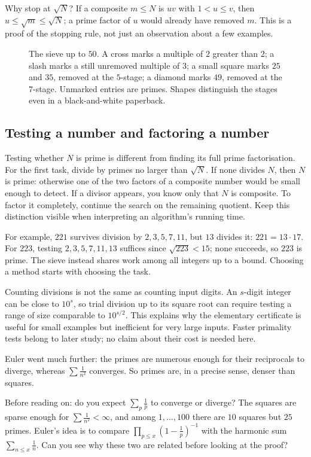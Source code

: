 Why stop at $\sqrt N$? If a composite $m\le N$ is $uv$ with $1<u\le v$, then $u\le\sqrt m\le\sqrt N$; a prime factor of $u$ would already have removed $m$. This is a proof of the stopping rule, not just an observation about a few examples.

\begin{figure}[ht]
\centering{}
\caption{The sieve up to $50$. A cross marks a multiple of $2$ greater than $2$; a slash marks a still unremoved multiple of $3$; a small square marks $25$ and $35$, removed at the $5$-stage; a diamond marks $49$, removed at the $7$-stage. Unmarked entries are primes. Shapes distinguish the stages even in a black-and-white paperback.}
\label{fig:sieve}
\end{figure}

\subsection*{Testing a number and factoring a number}
Testing whether $N$ is prime is different from finding its full prime factorisation. For the first task, divide by primes no larger than $\sqrt N$. If none divides $N$, then $N$ is prime: otherwise one of the two factors of a composite number would be small enough to detect. If a divisor appears, you know only that $N$ is composite. To factor it completely, continue the search on the remaining quotient. Keep this distinction visible when interpreting an algorithm's running time.

For example, $221$ survives division by $2,3,5,7,11$, but $13$ divides it:
$221=13\cdot17$. For $223$, testing $2,3,5,7,11,13$ suffices since $\sqrt{223}<15$;
none succeeds, so $223$ is prime. The sieve instead shares work among all
integers up to a bound. Choosing a method starts with choosing the task.

Counting divisions is not the same as counting input digits. An $s$-digit
integer can be close to $10^s$, so trial division up to its square root
can require testing a range of size comparable to $10^{s/2}$. This explains
why the elementary certificate is useful for small examples but inefficient
for very large inputs. Faster primality tests belong to later study; no
claim about their cost is needed here.

Euler went much further: the primes are numerous enough for their reciprocals to diverge, whereas $\sum\frac1{n^2}$ converges. So primes are, in a precise sense, denser than squares.

\begin{think}
Before reading on: do you expect $\sum_p\frac1p$ to converge or diverge? The squares are sparse enough for $\sum\frac1{n^2}<\infty$, and among $1,\dots,100$ there are $10$ squares but $25$ primes. Euler's idea is to compare $\prod_{p\le x}(1-\frac1p)^{-1}$ with the harmonic sum $\sum_{n\le x}\frac1n$. Can you see why these two are related before looking at the proof?
\end{think}

